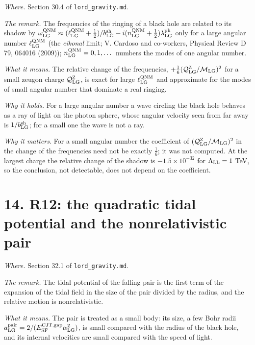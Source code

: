 \documentclass[
  10pt,
]{article}
\begin{document}
\emph{Where.} Section 30.4 of \texttt{lord\_gravity.md}.

\emph{The remark.} The frequencies of the ringing of a black hole are
related to its shadow by
\(\omega^{\rm QNM}_{\rm LG}\approx(\ell^{\rm QNM}_{\rm LG}+\tfrac12)/b^{\rm sh}_{\rm LG}-i(n^{\rm QNM}_{\rm LG}+\tfrac12)\lambda^{\rm ph}_{\rm LG}\)
only for a large angular number \(\ell^{\rm QNM}_{\rm LG}\) (the
\emph{eikonal} limit; V. Cardoso and co-workers, Physical Review D 79,
064016 (2009)); \(n^{\rm QNM}_{\rm LG}=0,1,\dots\) numbers the modes of
one angular number.

\emph{What it means.} The relative change of the frequencies,
\(+\tfrac16(\mathcal Q^{\rm Z}_{\rm LG}/\mathcal M_{\rm LG})^2\) for a
small zeugon charge \(\mathcal Q^{\rm Z}_{\rm LG}\), is exact for large
\(\ell^{\rm QNM}_{\rm LG}\) and approximate for the modes of small
angular number that dominate a real ringing.

\emph{Why it holds.} For a large angular number a wave circling the
black hole behaves as a ray of light on the photon sphere, whose angular
velocity seen from far away is \(1/b^{\rm sh}_{\rm LG}\); for a small
one the wave is not a ray.

\emph{Why it matters.} For a small angular number the coefficient of
\((\mathcal Q^{\rm Z}_{\rm LG}/\mathcal M_{\rm LG})^2\) in the change of
the frequencies need not be exactly \(\tfrac16\); it was not computed.
At the largest charge the relative change of the shadow is
\(-1.5\times10^{-32}\) for \(\Lambda_{\rm LL}=1\) TeV, so the
conclusion, not detectable, does not depend on the coefficient.

\hypertarget{r12-the-quadratic-tidal-potential-and-the-nonrelativistic-pair}{%
\section{14. R12: the quadratic tidal potential and the nonrelativistic
pair}\label{r12-the-quadratic-tidal-potential-and-the-nonrelativistic-pair}}

\emph{Where.} Section 32.1 of \texttt{lord\_gravity.md}.

\emph{The remark.} The tidal potential of the falling pair is the first
term of the expansion of the tidal field in the size of the pair divided
by the radius, and the relative motion is nonrelativistic.

\emph{What it means.} The pair is treated as a small body: its size, a
few Bohr radii
\(a^{\rm pair}_{\rm LG}=2/(E^{\rm CJT,gap}_{\rm SF}\alpha^{\rm Z}_{\rm LG})\),
is small compared with the radius of the black hole, and its internal
velocities are small compared with the speed of light.
\end{document}
